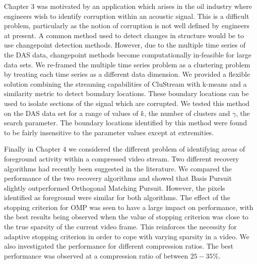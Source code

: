 
Chapter 3 was motivated by an application which arises in the oil industry where engineers wish to identify corruption within an acoustic signal. This is a difficult problem, particularly as the notion of corruption is not well defined by engineers at present. A common method used to detect changes in structure would be to use changepoint detection methods. However, due to the multiple time series of the DAS data, changepoint methods become computationally in-feasible for large data sets. We re-framed the multiple time series problem as a clustering problem by treating each time series as a different data dimension. We provided a flexible solution combining the streaming capabilities of CluStream with k-means and a similarity metric to detect boundary locations. These boundary locations can be used to isolate sections of the signal which are corrupted. We tested this method on the DAS data set for a range of values of $k$, the number of clusters and $\gamma$, the search parameter. The boundary locations identified by this method were found to be fairly insensitive to the parameter values except at extremities.

Finally in Chapter 4 we considered the different problem of identifying areas of foreground activity within a compressed video stream. Two different recovery algorithms had recently been suggested  in the literature. We compared the  performance of the two recovery algorithms and showed that Basis Pursuit slightly outperformed Orthogonal Matching Pursuit. However, the pixels identified as foreground were similar for both algorithms. The effect of the stopping criterion for OMP was seen to have a large impact on performance, with the best results being observed when the value of stopping criterion was close to the true sparsity of the current video frame. This reinforces the necessity for adaptive stopping criterion in order to cope with varying sparsity in a video. We also investigated the performance for different compression ratios. The best performance was observed at a compression ratio of between $25 - 35\%$. 




